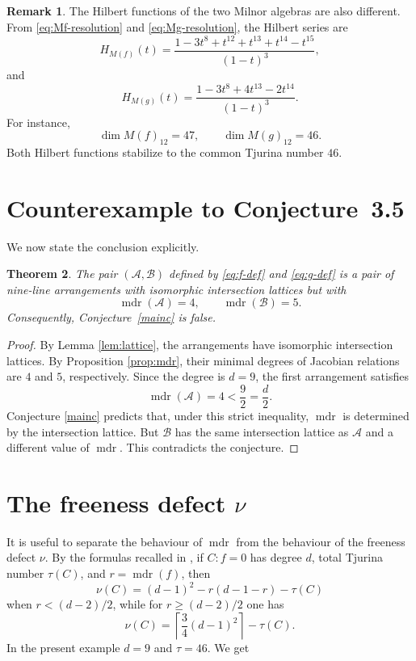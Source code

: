 \documentclass[11pt]{amsart}
\newcommand{\cA}{\mathcal A}
\newcommand{\cB}{\mathcal B}
\newcommand{\mdr}{\operatorname{mdr}}
\theoremstyle{plain}
\newtheorem{theorem}{Theorem}[section]
\theoremstyle{definition}
\newtheorem{remark}[theorem]{Remark}
\numberwithin{equation}{section}
\begin{document}
\begin{remark}
The Hilbert functions of the two Milnor algebras are also different.  From \eqref{eq:Mf-resolution} and \eqref{eq:Mg-resolution}, the Hilbert series are
\[
H_{M(f)}(t)=\frac{1-3t^8+t^{12}+t^{13}+t^{14}-t^{15}}{(1-t)^3},
\]
and
\[
H_{M(g)}(t)=\frac{1-3t^8+4t^{13}-2t^{14}}{(1-t)^3}.
\]
For instance,
\[
\dim M(f)_{12}=47,
\qquad
\dim M(g)_{12}=46.
\]
Both Hilbert functions stabilize to the common Tjurina number \(46\).
\end{remark}

\section{Counterexample to Conjecture~3.5}

We now state the conclusion explicitly.

\begin{theorem}\label{thm:counterexample}
The pair \((\cA,\cB)\) defined by \eqref{eq:f-def} and \eqref{eq:g-def} is a pair of nine-line arrangements with isomorphic intersection lattices but with
\[
\mdr(\cA)=4,
\qquad
\mdr(\cB)=5.
\]
Consequently, Conjecture~\ref{mainc} is false.
\end{theorem}

\begin{proof}
By Lemma \ref{lem:lattice}, the arrangements have isomorphic intersection lattices.  By Proposition \ref{prop:mdr}, their minimal degrees of Jacobian relations are \(4\) and \(5\), respectively.  Since the degree is \(d=9\), the first arrangement satisfies
\[
\mdr(\cA)=4<\frac92=\frac d2.
\]
Conjecture \ref{mainc} predicts that, under this strict inequality, \(\mdr\) is determined by the intersection lattice.  But \(\cB\) has the same intersection lattice as \(\cA\) and a different value of \(\mdr\).  This contradicts the conjecture.
\end{proof}

\section{The freeness defect \texorpdfstring{\(\nu\)}{nu}}

It is useful to separate the behaviour of \(\mdr\) from the behaviour of the freeness defect \(\nu\).  By the formulas recalled in \cite{DimcaOpen}, if \(C:f=0\) has degree \(d\), total Tjurina number \(\tau(C)\), and \(r=\mdr(f)\), then
\[
\nu(C)=(d-1)^2-r(d-1-r)-\tau(C)
\]
when \(r<(d-2)/2\), while for  \(r\geq (d-2)/2\) one has
\[
\nu(C)=\left\lceil \frac34(d-1)^2\right\rceil-\tau(C).
\]
In the present example \(d=9\) and \(\tau=46\).  We get
\end{document}
